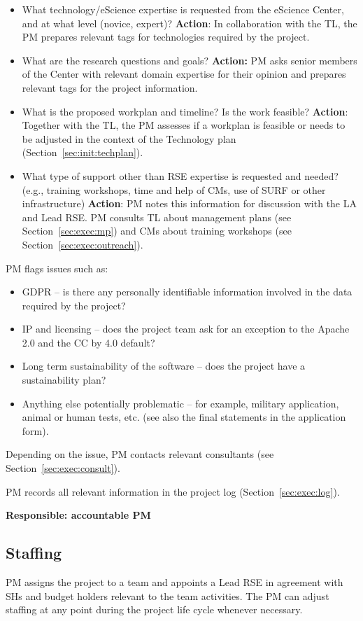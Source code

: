\documentclass[11pt]{article}
\begin{document}
\begin{itemize}
\item What technology/eScience expertise is requested from the eScience Center, and at what level (novice, expert)?
\textbf{Action}: In collaboration with the TL, the PM prepares relevant tags for technologies required by the project.
\item What are the research questions and goals? \textbf{Action:} PM asks senior members of the Center with relevant domain
expertise for their opinion and prepares relevant tags for the project information.
\item What is the proposed workplan and timeline? Is the work feasible? \textbf{Action}: Together with the TL, the PM assesses
if a workplan is feasible or needs to be adjusted in the context of the Technology plan (Section~\ref{sec:init:techplan}).
\item What type of support other than RSE expertise is requested and needed? (e.g., training workshops, time and help of CMs,
use of SURF or other infrastructure) \textbf{Action}: PM notes this information for discussion with the LA and Lead
RSE. PM consults TL about management plans (see Section~\ref{sec:exec:mp}) and CMs about training workshops (see
Section~\ref{sec:exec:outreach}).
\end{itemize}
PM flags issues such as:
\begin{itemize}
\item GDPR – is there any personally identifiable information involved in the data required by the project? 
\item IP and licensing – does the project team ask for an exception to the Apache 2.0 and the CC by 4.0 default? 
\item Long term sustainability of the software – does the project have a sustainability plan? 
\item Anything else potentially problematic – for example, military application, animal or human tests, etc. (see also the
final statements in the application form).
\end{itemize}

Depending on the issue, PM contacts relevant consultants (see Section~\ref{sec:exec:consult}).

PM records all relevant information in the project log (Section~\ref{sec:exec:log}).

\textbf{Responsible: accountable PM}



\subsection{Staffing}
PM assigns the project to a team and appoints a Lead RSE in agreement with SHs and budget
holders relevant to the team activities. The PM can adjust staffing at any point during the project life cycle
whenever necessary.
\end{document}
